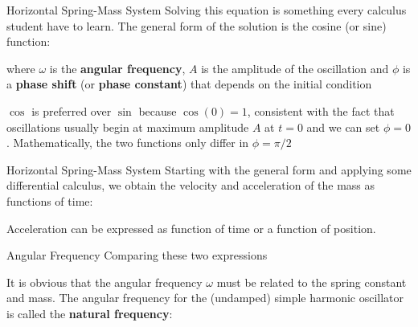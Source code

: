\documentclass[12pt,compress,aspectratio=169]{beamer}
\begin{document}
\begin{frame}{Horizontal Spring-Mass System}
  Solving this equation is something  every calculus student have to learn. The
  general form of the solution is the cosine (or sine) function:


  \vspace{-.1in}where $\omega$ is the \textbf{angular frequency}, $A$ is the
  amplitude of the oscillation and $\phi$ is a \textbf{phase shift} (or
  \textbf{phase constant}) that depends on the initial condition
  
  \vspace{.15in}$\cos$ is preferred over $\sin$ because $\cos(0)=1$,
  consistent with the fact that oscillations usually begin at maximum amplitude
  $A$ at $t=0$ and we can set $\phi=0$. Mathematically, the two functions only
  differ in $\phi=\pi/2$
\end{frame}


\begin{frame}{Horizontal Spring-Mass System}
  Starting with the general form and applying some differential calculus, we
  obtain the velocity and acceleration of the mass as functions of time:
 
  \vspace{-.35in}{\Large
    \begin{align*}
      x(t)&=A\cos(\omega t-\phi)\\
      v(t)&=-A\omega\sin(\omega t-\phi)\\
      a(t)&=-A\omega^2\cos(\omega t-\phi)=-\omega^2x
    \end{align*}
  }

  Acceleration can be expressed as function of time or a function of position.
\end{frame}



\begin{frame}{Angular Frequency}
  Comparing these two expressions

  
  It is obvious that the angular frequency $\omega$ must be related to the
  spring constant and mass. The angular frequency for the (undamped) simple
  harmonic oscillator is called the \textbf{natural frequency}:

\end{frame}
\end{document}
